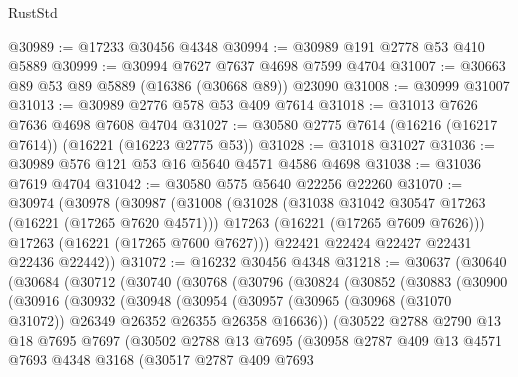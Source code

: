 \begin{lexlean}{RustStd}
\begin{coremodule}
@30989 := @17233 @30456 @4348
@30994 := @30989 @191 @2778 @53 @410 @5889
@30999 := @30994 @7627 @7637 @4698 @7599 @4704
@31007 := @30663 @89 @53 @89 @5889 (@16386 (@30668 @89)) @23090
@31008 := @30999 @31007
@31013 := @30989 @2776 @578 @53 @409 @7614
@31018 := @31013 @7626 @7636 @4698 @7608 @4704
@31027 := @30580 @2775 @7614 (@16216 (@16217 @7614)) (@16221 (@16223 @2775 @53))
@31028 := @31018 @31027
@31036 := @30989 @576 @121 @53 @16 @5640 @4571 @4586 @4698
@31038 := @31036 @7619 @4704
@31042 := @30580 @575 @5640 @22256 @22260
@31070 := @30974
    (@30978
      (@30987
        (@31008
          (@31028
            (@31038 @31042 @30547 @17263 (@16221 (@17265 @7620 @4571)))
            @17263
            (@16221 (@17265 @7609 @7626)))
          @17263
          (@16221 (@17265 @7600 @7627)))
        @22421
        @22424
        @22427
        @22431
        @22436
        @22442))
@31072 := @16232 @30456 @4348
@31218 := @30637
    (@30640
      (@30684
        (@30712
          (@30740
            (@30768
              (@30796
                (@30824
                  (@30852
                    (@30883
                      (@30900
                        (@30916
                          (@30932
                            (@30948
                              (@30954
                                (@30957
                                  (@30965
                                    (@30968 (@31070 @31072))
                                    @26349
                                    @26352
                                    @26355
                                    @26358
                                    @16636))
                                (@30522
                                  @2788
                                  @2790
                                  @13
                                  @18
                                  @7695
                                  @7697
                                  (@30502
                                    @2788
                                    @13
                                    @7695
                                    (@30958
                                      @2787
                                      @409
                                      @13
                                      @4571
                                      @7693
                                      @4348
                                      @3168
                                      (@30517
                                        @2787
                                        @409
                                        @7693

\end{coremodule}
\end{lexlean}
